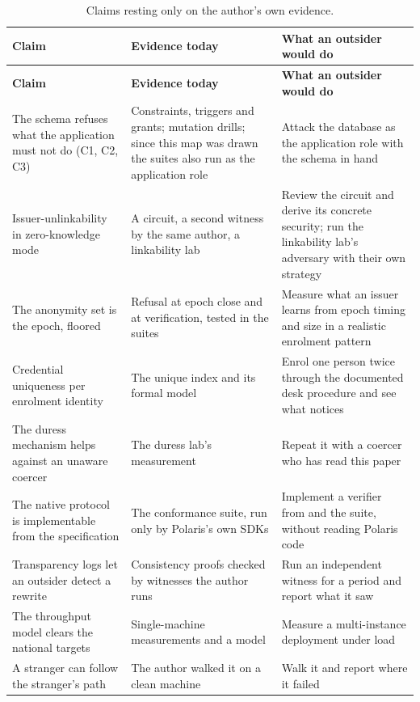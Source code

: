 {\footnotesize
\setlength{\tabcolsep}{4pt}\renewcommand{\arraystretch}{1.12}
\begin{xltabular}{\textwidth}{>{\RaggedRight\arraybackslash\hspace{0pt}}p{1.7in} >{\RaggedRight\arraybackslash\hspace{0pt}}X >{\RaggedRight\arraybackslash\hspace{0pt}}p{1.9in}}
\caption{Claims resting only on the author's own evidence.}\label{tab:untested}\\
\toprule
\textbf{Claim} & \textbf{Evidence today} & \textbf{What an outsider would do} \\
\midrule
\endfirsthead
\toprule
\textbf{Claim} & \textbf{Evidence today} & \textbf{What an outsider would do} \\
\midrule
\endhead
The schema refuses what the application must not do (C1, C2, C3) & Constraints, triggers and grants; mutation drills; since this map was drawn the suites also run as the application role & Attack the database as the application role with the schema in hand \\
Issuer-unlinkability in zero-knowledge mode & A circuit, a second witness by the same author, a linkability lab & Review the circuit and derive its concrete security; run the linkability lab's adversary with their own strategy \\
The anonymity set is the epoch, floored & Refusal at epoch close and at verification, tested in the suites & Measure what an issuer learns from epoch timing and size in a realistic enrolment pattern \\
Credential uniqueness per enrolment identity & The unique index and its formal model & Enrol one person twice through the documented desk procedure and see what notices \\
The duress mechanism helps against an unaware coercer & The duress lab's measurement & Repeat it with a coercer who has read this paper \\
The native protocol is implementable from the specification & The conformance suite, run only by Polaris's own SDKs & Implement a verifier from  and the suite, without reading Polaris code \\
Transparency logs let an outsider detect a rewrite & Consistency proofs checked by witnesses the author runs & Run an independent witness for a period and report what it saw \\
The throughput model clears the national targets & Single-machine measurements and a model & Measure a multi-instance deployment under load \\
A stranger can follow the stranger's path & The author walked it on a clean machine & Walk it and report where it failed \\
\bottomrule
\end{xltabular}
}

